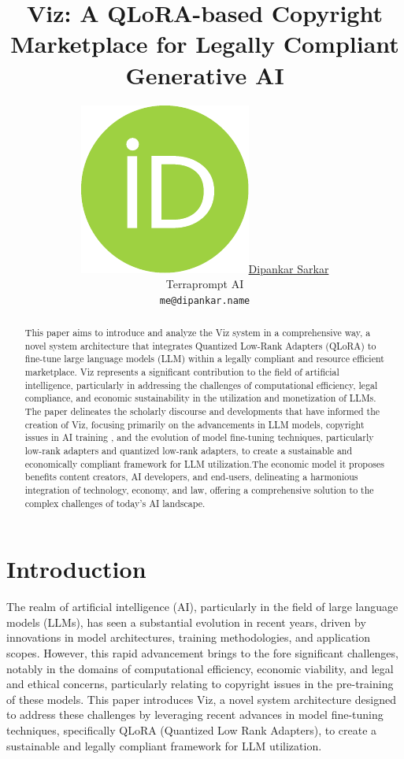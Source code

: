 \documentclass{article}
\title{Viz: A QLoRA-based Copyright Marketplace for Legally Compliant Generative AI}
\author{ \href{https://orcid.org/0000-0001-5431-6367}{\includegraphics[scale=0.06]{orcid.pdf}\hspace{1mm}Dipankar Sarkar} \\
  Terraprompt AI \\
  \texttt{me@dipankar.name} \\
}
\begin{document}
\maketitle

\begin{abstract}
This paper aims to introduce and analyze the Viz system in a comprehensive way, a novel system architecture that integrates Quantized Low-Rank Adapters (QLoRA) to fine-tune large language models (LLM) within a legally compliant and resource efficient marketplace. Viz represents a significant contribution to the field of artificial intelligence, particularly in addressing the challenges of computational efficiency, legal compliance, and economic sustainability in the utilization and monetization of LLMs. The paper delineates the scholarly discourse and developments that have informed the creation of Viz, focusing primarily on the advancements in LLM models, copyright issues in AI training \cite{NYT_OpenAI_2023}, and the evolution of model fine-tuning techniques, particularly low-rank adapters and quantized low-rank adapters, to create a sustainable and economically compliant framework for LLM utilization.The economic model it proposes benefits content creators, AI developers, and end-users, delineating a harmonious integration of technology, economy, and law, offering a comprehensive solution to the complex challenges of today's AI landscape.
\end{abstract}



\section{Introduction}

The realm of artificial intelligence (AI), particularly in the field of large language models (LLMs), has seen a substantial evolution in recent years, driven by innovations in model architectures, training methodologies, and application scopes. However, this rapid advancement brings to the fore significant challenges, notably in the domains of computational efficiency, economic viability, and legal and ethical concerns, particularly relating to copyright issues \citep{NYT_OpenAI_2023} in the pre-training of these models. This paper introduces Viz, a novel system architecture designed to address these challenges by leveraging recent advances in model fine-tuning techniques, specifically QLoRA (Quantized Low Rank Adapters), to create a sustainable and legally compliant framework for LLM utilization.
\end{document}
